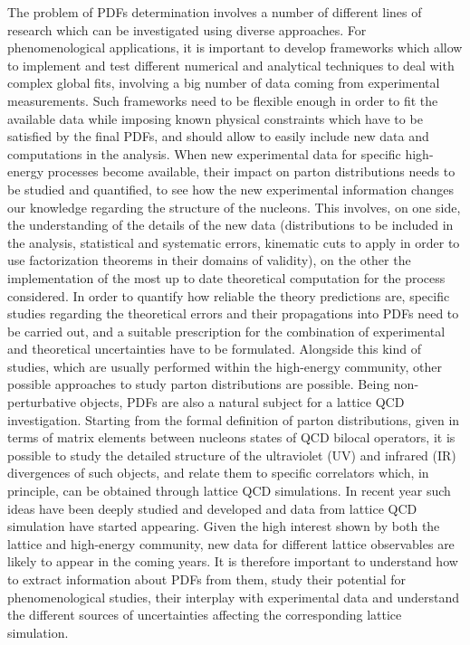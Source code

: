 The problem of PDFs determination involves a number of different lines of research which can be investigated 
using diverse approaches.
%
For phenomenological applications, it is important to develop frameworks which allow to implement and test
different numerical and analytical techniques to deal with complex global fits, involving a big number of data coming
from experimental measurements. Such frameworks need to be flexible enough in order to fit the available data 
while imposing known physical constraints which have to be satisfied by the final PDFs,
and should allow to easily include new data and computations in the analysis. 
%
When new experimental data for specific high-energy processes become available,
their impact on parton distributions needs to be studied and quantified, to see how the new experimental 
information changes our knowledge regarding the structure of the nucleons.
This involves, on one side, the understanding of the details of the new data (distributions to be included in the analysis,
statistical and systematic errors, kinematic cuts to apply in order to use factorization theorems in their domains of validity), 
on the other the implementation of the most up to date theoretical computation for the process considered.  
%
In order to quantify how reliable the theory predictions are, specific studies regarding the theoretical errors
and their propagations into PDFs need to be carried out, and a suitable prescription for the combination
of experimental and theoretical uncertainties have to be formulated.
%
Alongside this kind of studies, which are usually performed within the high-energy community,
other possible approaches to study parton distributions are possible.
Being non-perturbative objects, PDFs are also a natural subject for a lattice QCD investigation. 
Starting from the formal definition of parton distributions, given in terms of matrix elements between 
nucleons states of QCD bilocal operators, it is possible to study the detailed structure of the ultraviolet (UV)
and infrared (IR) divergences of such objects, and relate them to specific correlators which, in principle, 
can be obtained through lattice QCD simulations. In recent year such ideas have been deeply studied and developed
and data from lattice QCD simulation have started appearing. 
Given the high interest shown by both the lattice and high-energy community, new data for different lattice observables
are likely to appear in the coming years. 
It is therefore important to understand how to extract information about PDFs from them, 
study their potential for phenomenological studies,
their interplay with experimental data and understand the different sources of uncertainties 
affecting the corresponding lattice simulation.

